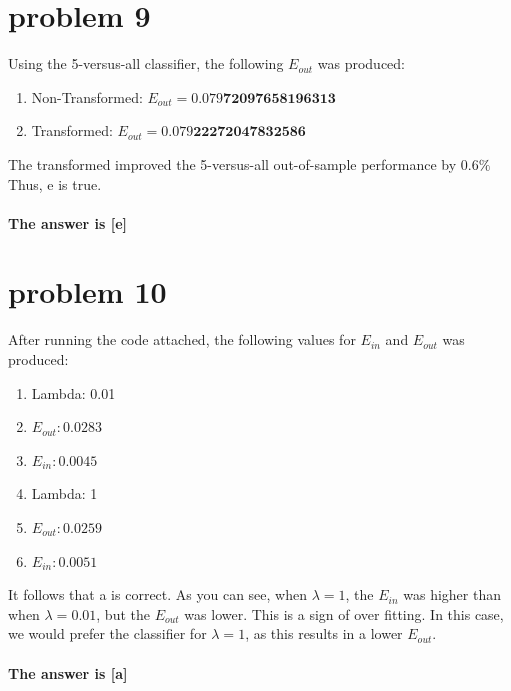 \documentclass{article}
\begin{document}
\section*{problem 9}
Using the 5-versus-all classifier, the following $E_{out}$ was produced:
\begin{enumerate}[label = ]
    \item Non-Transformed: $E_{out} = 0.079\textbf{72097658196313}$
    \item Transformed: $E_{out} = 0.079\textbf{22272047832586}$
\end{enumerate}
The transformed improved the 5-versus-all out-of-sample performance by $0.6\%$ Thus, e is true.\\\\
\textbf{The answer is [e]}

\section*{problem 10}
After running the code attached, the following values for $E_{in}$ and $E_{out}$ was produced:
\begin{enumerate}[label =]
    \item Lambda: 0.01
    \item $E_{out}: 0.0283$
    \item $E_{in}: 0.0045$
    \item Lambda: 1
    \item $E_{out}: 0.0259$
    \item $E_{in}: 0.0051$
\end{enumerate}
It follows that a is correct. As you can see, when $\lambda = 1$, the $E_{in}$ was higher than when $\lambda = 0.01$, but the $E_{out}$ was lower. This is a sign of over fitting. In this case, we would prefer the classifier for $\lambda = 1$, as this results in a lower $E_{out}$.\\\\
\textbf{The answer is [a]}
\end{document}
